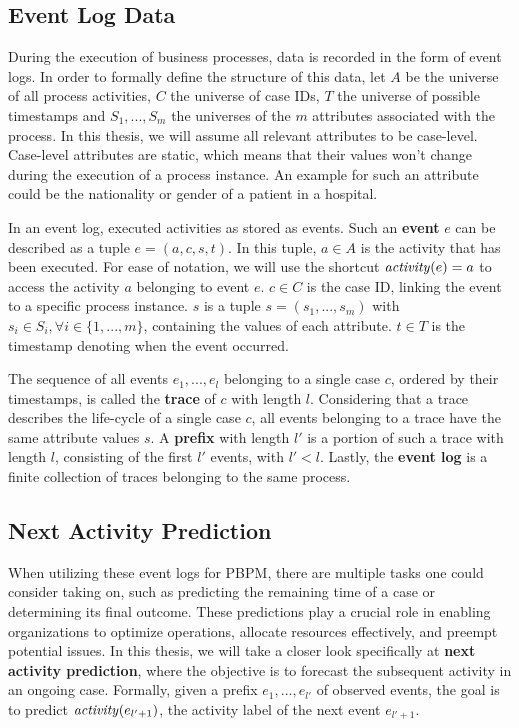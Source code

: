 
\subsection{Event Log Data}
During the execution of business processes, data is recorded in the form of event logs.
In order to formally define the structure of this data,
let $A$ be the universe of all process activities,
$C$ the universe of case IDs,
$T$ the universe of possible timestamps
and $S_1, ..., S_m$ the universes of the $m$ attributes associated with the process.
In this thesis, we will assume all relevant attributes to be case-level.
Case-level attributes are static,
which means that their values won't change during the execution of a process instance.
An example for such an attribute could be the nationality or gender of a patient in a hospital.

In an event log, executed activities as stored as events.
Such an \textbf{event} $e$ can be described as a tuple $e = (a, c, s, t)$.
In this tuple, $a \in A$ is the activity that has been executed.
For ease of notation, we will use the shortcut $\text{\textit{activity}}(e) = a$
to access the activity $a$ belonging to event $e$.
$c \in C$ is the case ID, linking the event to a specific process instance.
$s$ is a tuple $s = (s_1, ..., s_m)$ with $s_i \in S_i, \forall i \in \{1, ..., m\}$,
containing the values of each attribute.
$t \in T$ is the timestamp denoting when the event occurred.

The sequence of all events $e_1, ..., e_l$ belonging to a single case $c$,
ordered by their timestamps, is called the \textbf{trace} of $c$ with length $l$.
Considering that a trace describes the life-cycle of a single case $c$,
all events belonging to a trace have the same attribute values $s$.
A \textbf{prefix} with length $l'$ is a portion of such a trace with length $l$,
consisting of the first $l'$ events, with $l' < l$.
Lastly, the \textbf{event log} is a finite collection of traces belonging to the same process.


\subsection{Next Activity Prediction}
When utilizing these event logs for PBPM,
there are multiple tasks one could consider taking on,
such as predicting the remaining time of a case or determining its final outcome.
These predictions play a crucial role in enabling organizations to optimize operations,
allocate resources effectively, and preempt potential issues.
In this thesis, we will take a closer look specifically at \textbf{next activity prediction},
where the objective is to forecast the subsequent activity in an ongoing case.
Formally, given a prefix $e_1, ..., e_{l'}$ of observed events,
the goal is to predict $\text{\textit{activity}}(e_{l'+1})$,
the activity label of the next event $e_{l'+1}$.

